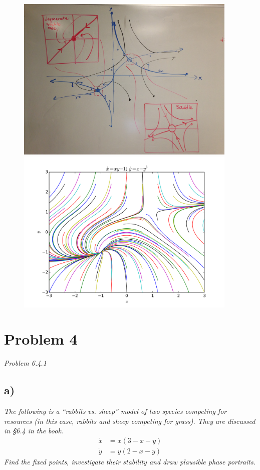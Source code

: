 \documentclass[12pt]{article}
\begin{document}
\begin{figure}[ht]
    \centering
    \includegraphics[width=400px]{figures/3_drawing.jpg}
    \includegraphics[width=400px]{figures/3_simulation.png}
\end{figure}

\FloatBarrier
\section*{Problem 4}
\emph{Problem 6.4.1}

\subsection*{ a)}
\emph{The following is a ``rabbits vs. sheep'' model of two species competing for resources (in this case, rabbits and sheep competing for grass).  They are discussed in \S6.4 in the book.}
\begin{align*}
	\dot{x} &= x(3 - x - y) \\
	\dot{y} &= y(2 - x - y)
\end{align*}
\emph{Find the fixed points, investigate their stability and draw plausible phase portraits.} \\
\end{document}
